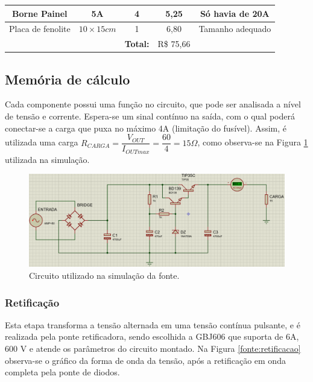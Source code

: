 \documentclass[a4paper,12pt,oneside,openany,table,xcdraw]{article}
\begin{document}
\begin{table}[H]
{\begin{tabular}{cc|c|c|c}
\multicolumn{1}{|c|}{Borne Painel}                  & 5A                     & 4                   & 	5,25	  & \multicolumn{1}{c|}{Só havia de 20A}       \\ \hline
\multicolumn{1}{|c|}{Placa de fenolite}             & $10\times 15cm$        & 1                   & 6,80                         & \multicolumn{1}{c|}{Tamanho adequado}      \\ \hline
                                                    &                        & \textbf{Total:}     & R\$ 75,66                    &                                            \\ \cline{3-4}
\end{tabular}%
}
\end{table}

\vspace{0.5cm}
\subsection{Memória de cálculo} %
Cada componente possui uma função no circuito, que pode ser analisada a nível de tensão e corrente. Espera-se um sinal contínuo na saída, com o qual poderá conectar-se a carga que puxa no máximo 4A (limitação do fusível). Assim, é utilizada uma carga $R_{CARGA}=\dfrac{V_{OUT}}{I_{OUTmax}}=\dfrac{60}{4}=15\Omega$, como observa-se na Figura \ref{fonte:simulacao:circuito} utilizada na simulação.
\vspace{0.5cm}

\begin{figure}[H]
\centering
  
\includegraphics[width=15cm]{fonte-simulacao-circuito}
\caption{Circuito utilizado na simulação da fonte.}
\label{fonte:simulacao:circuito}
\end{figure}
\vspace{0.3cm}

\subsubsection{Retificação}
Esta etapa transforma a tensão alternada em uma tensão contínua pulsante, e é realizada pela ponte retificadora, sendo escolhida a GBJ606 que suporta de 6A, 600 V e atende os parâmetros do circuito montado. Na Figura \ref{fonte:retificacao} observa-se o gráfico da forma de onda da tensão, após a retificação em onda completa pela ponte de diodos.
\end{document}
